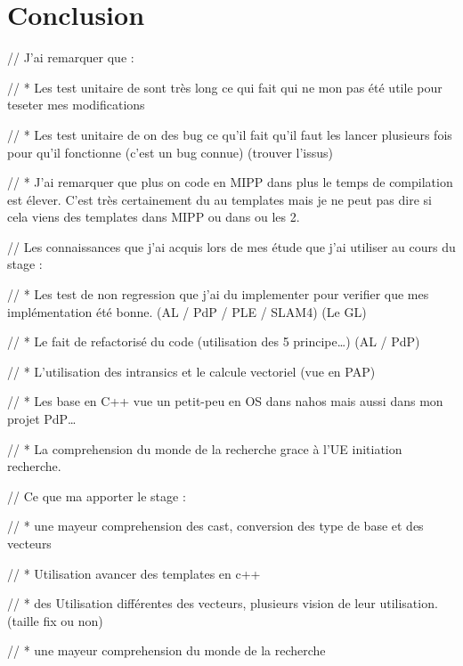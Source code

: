 \section{Conclusion}

// J'ai remarquer que :

// * Les test unitaire de \Eigen sont très long ce qui fait qui ne mon pas été utile
pour teseter mes modifications

// * Les test unitaire de \Eigen on des bug ce qu'il fait qu'il faut les lancer plusieurs
fois pour qu'il fonctionne (c'est un bug connue) (trouver l'issus)

// * J'ai remarquer que plus on code en MIPP dans \Eigen plus le temps de compilation est
élever. C'est très certainement du au templates mais je ne peut pas dire si cela viens
des templates dans MIPP ou dans \Eigen ou les 2.

// Les connaissances que j'ai acquis lors de mes étude que j'ai utiliser au cours du
stage :

// * Les test de non regression que j'ai du implementer pour verifier que mes
implémentation été bonne. (AL / PdP / PLE / SLAM4) (Le GL)

// * Le fait de refactorisé du code (utilisation des 5 principe\dots) (AL / PdP)

// * L'utilisation des intransics et le calcule vectoriel (vue en PAP)

// * Les base en C++ vue un petit-peu en OS dans nahos mais aussi dans mon projet PdP\dots

// * La comprehension du monde de la recherche grace à l'UE initiation recherche.

// Ce que ma apporter le stage :

// * une mayeur comprehension des cast, conversion des type de base et des vecteurs

// * Utilisation avancer des templates en c++

// * des Utilisation différentes des vecteurs, plusieurs vision de leur utilisation.
(taille fix ou non)

// * une mayeur comprehension du monde de la recherche

